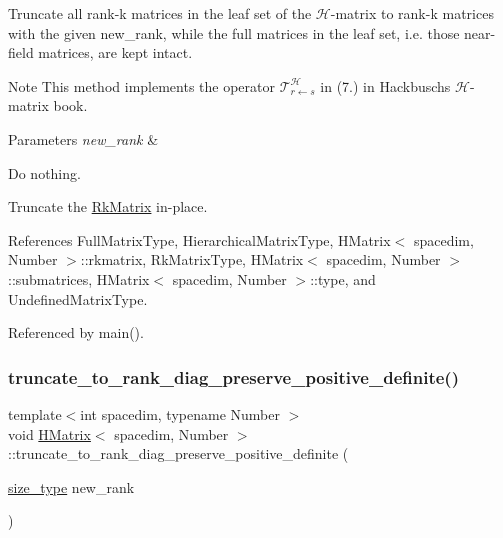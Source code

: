 Truncate all rank-\/k matrices in the leaf set of the $\mathcal{H}$-\/matrix to rank-\/k matrices with the given {\ttfamily new\+\_\+rank}, while the full matrices in the leaf set, i.\+e. those near-\/field matrices, are kept intact.


\begin{DoxyDescription}
\item[Note ]This method implements the operator $\mathcal{T}_{r \leftarrow s}^{\mathcal{H}}$ in (7.) in Hackbusch\textquotesingle{}s $\mathcal{H}$-\/matrix book. 
\end{DoxyDescription}
\begin{DoxyParams}{Parameters}
{\em new\+\_\+rank} & \\
\hline
\end{DoxyParams}
Do nothing.

Truncate the \hyperlink{classRkMatrix}{Rk\+Matrix} in-\/place.

References Full\+Matrix\+Type, Hierarchical\+Matrix\+Type, H\+Matrix$<$ spacedim, Number $>$\+::rkmatrix, Rk\+Matrix\+Type, H\+Matrix$<$ spacedim, Number $>$\+::submatrices, H\+Matrix$<$ spacedim, Number $>$\+::type, and Undefined\+Matrix\+Type.



Referenced by main().

\mbox{\label{classHMatrix_a93834ac1b8a659dc2b81cd3af1dea997}} 
\subsubsection{\texorpdfstring{truncate\+\_\+to\+\_\+rank\+\_\+diag\+\_\+preserve\+\_\+positive\+\_\+definite()}{truncate\_to\_rank\_diag\_preserve\_positive\_definite()}}
{\footnotesize\ttfamily template$<$int spacedim, typename Number $>$ \\
void \hyperlink{classHMatrix}{H\+Matrix}$<$ spacedim, Number $>$\+::truncate\+\_\+to\+\_\+rank\+\_\+diag\+\_\+preserve\+\_\+positive\+\_\+definite (\begin{DoxyParamCaption}\item[{\hyperlink{classHMatrix_a5ca8dc549783d38371a01ecd621ecb34}{size\+\_\+type}}]{new\+\_\+rank }\end{DoxyParamCaption})}

